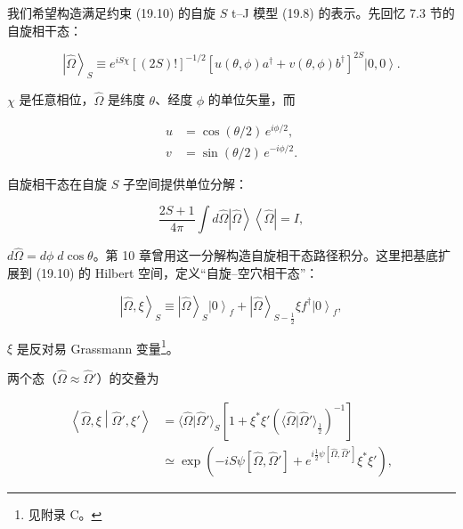 我们希望构造满足约束 (19.10) 的自旋 $S$ t--J 模型 (19.8) 的表示。先回忆 7.3 节的自旋相干态：

\begin{equation*}
\left| \hat {\Omega} \right\rangle_{S} \equiv e ^ {iS\chi} \left[ ( 2S )! \right] ^ {-1/2} \left[ u ( \theta, \phi ) a ^ {\dagger} + v ( \theta, \phi ) b ^ {\dagger} \right] ^ {2S} \left| 0, 0 \right\rangle .
\tag{19.11}
\end{equation*}

$\chi$ 是任意相位，$\hat{\Omega}$ 是纬度 $\theta$、经度 $\phi$ 的单位矢量，而

\begin{align*}
u & = \cos ( \theta / 2 ) \, e ^ {i\phi/2} ,\\
v & = \sin ( \theta / 2 ) \, e ^ {-i\phi/2} .
\tag{19.12}
\end{align*}

自旋相干态在自旋 $S$ 子空间提供单位分解：

\begin{equation*}
\frac {2S + 1}{4 \pi} \int d \hat {\Omega} \left| \hat {\Omega} \right\rangle \left\langle \hat {\Omega} \right| = I ,
\tag{19.13}
\end{equation*}

$d\hat{\Omega}=d\phi\; d\cos\theta$。第 10 章曾用这一分解构造自旋相干态路径积分。这里把基底扩展到 (19.10) 的 Hilbert 空间，定义“自旋--空穴相干态”：

\begin{equation*}
\left| \hat {\Omega}, \xi \right\rangle_{S} \equiv \left| \hat {\Omega} \right\rangle_{S} \left| 0 \right\rangle_{f} + \left| \hat {\Omega} \right\rangle_{S - \frac {1}{2}} \xi f ^ {\dagger} \left| 0 \right\rangle_{f} ,
\tag{19.14}
\end{equation*}

$\xi$ 是反对易 Grassmann 变量\footnote{见附录 C。}。

两个态（$\hat{\Omega} \approx \hat{\Omega}'$）的交叠为

\begin{align*}
\left\langle \hat {\Omega}, \xi \middle| \hat {\Omega} ', \xi ' \right\rangle & = \langle \hat {\Omega} | \hat {\Omega} ' \rangle_{S} \left[ 1 + \xi ^ {*} \xi ' \left( \langle \hat {\Omega} | \hat {\Omega} ' \rangle_{\frac {1}{2}} \right) ^ {- 1} \right]\\
& \simeq \exp \left( - iS \psi [ \hat {\Omega}, \hat {\Omega} ' ] + e ^ {i \frac {1}{2} \psi [ \hat {\Omega}, \hat {\Omega} ' ]} \xi ^ {*} \xi ' \right) ,
\tag{19.15}
\end{align*}

